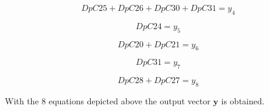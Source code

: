 \vspace{4mm}
\begin {equation}
    DpC25 + DpC26 + DpC30 + DpC31 = y_4
\end{equation}

\vspace{4mm}
\begin {equation}
    DpC24 = y_5
\end{equation}

\vspace{4mm}
\begin {equation}
    DpC20 + DpC21= y_6
\end{equation}

\vspace{4mm}
\begin {equation}
    DpC31 = y_7
\end{equation}

\vspace{4mm}
\begin {equation}
    DpC28 + DpC27 = y_8
\end{equation}

With the $8$ equations depicted above the output vector $\pmb{y}$ is obtained. 